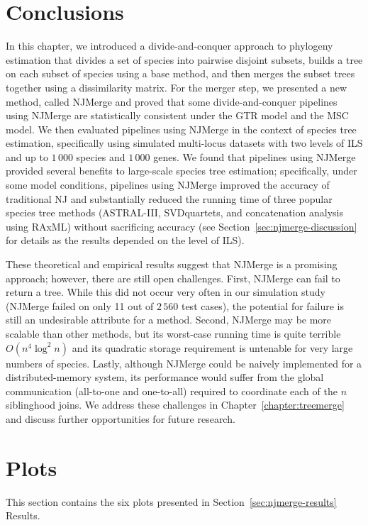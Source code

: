 \section{Conclusions}
In this chapter, we introduced a divide-and-conquer approach to phylogeny estimation that divides a set of species into pairwise disjoint subsets, builds a tree on each subset of species using a base method, and then merges the subset trees together using a dissimilarity matrix.
For the merger step, we presented a new method, called NJMerge and proved that some divide-and-conquer pipelines using NJMerge are statistically consistent under the GTR model and the MSC model.
We then evaluated pipelines using NJMerge in the context of species tree estimation, specifically using simulated multi-locus datasets with two levels of ILS and up to $1\,000$ species and $1\,000$ genes. 
We found that pipelines using NJMerge provided several benefits to large-scale species tree estimation; specifically, under some model conditions, pipelines using NJMerge improved the accuracy of traditional NJ and substantially reduced the running time of three popular species tree methods (ASTRAL-III, SVDquartets, and concatenation analysis using RAxML) without sacrificing accuracy (see Section~\ref{sec:njmerge-discussion} for details as the results depended on the level of ILS).

These theoretical and empirical results suggest that NJMerge is a promising approach; however, there are still open challenges.
First, NJMerge can fail to return a tree.
While this did not occur very often in our simulation study (NJMerge failed on only 11 out of $2\,560$ test cases), the potential for failure is still an undesirable attribute for a method.
Second, NJMerge may be more scalable than other methods, but its worst-case running time is quite terrible $O(n^4 \log^2{n})$ and its quadratic storage requirement is untenable for very large numbers of species.
Lastly, although NJMerge could be naively implemented for a distributed-memory system, its performance would suffer from the global communication (all-to-one and one-to-all) required to coordinate each of the $n$ siblinghood joins.
We address these challenges in Chapter~\ref{chapter:treemerge} and discuss further opportunities for future research.

\clearpage
\newpage

\section{Plots}
\label{sec:njmerge-plots}
This section contains the six plots presented in Section~\ref{sec:njmerge-results} Results.

